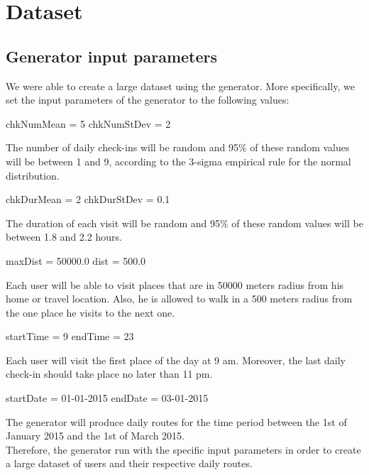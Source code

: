 \chapter{Dataset}

\section{Generator input parameters}

We were able to create a large dataset using the generator. More specifically, we set the input parameters of the generator to the following values:

\begin{center}
 chkNumMean = 5 chkNumStDev = 2
\end{center}

The number of daily check-ins will be random and 95\% of these random values will be between 1 and 9, according to the 3-sigma empirical rule for the normal 
distribution. 

\begin{center}
 chkDurMean = 2 chkDurStDev = 0.1
\end{center}

The duration of each visit will be random and 95\% of these random values will be between 1.8 and 2.2 hours.

\begin{center}
 maxDist = 50000.0 dist = 500.0
\end{center}

Each user will be able to visit places that are in 50000 meters radius from his home or travel location. Also, he is allowed to walk in a 500 meters radius 
from the one place he visits to the next one.

\begin{center}
 startTime = 9 endTime = 23
\end{center}

Each user will visit the first place of the day at 9 am. Moreover, the last daily check-in should take place no later than 11 pm.

\begin{center}
 startDate = 01-01-2015 endDate = 03-01-2015
\end{center}

The generator will produce daily routes for the time period between the 1st of January 2015 and the 1st of March 2015. \\

Therefore, the generator run with the specific input parameters in order to create a large dataset of users and their respective daily routes. 

